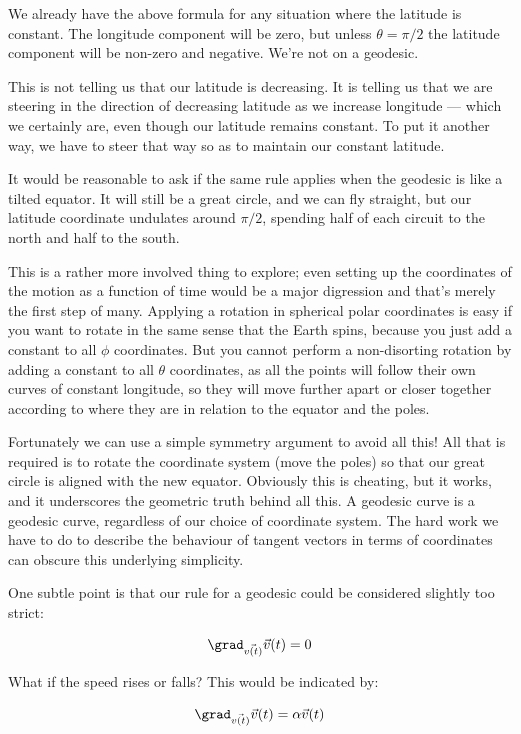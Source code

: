 We already have the above formula for any situation where the latitude is constant. The longitude component will be zero, but unless $\theta = \pi/2$ the latitude component will be non-zero and negative. We're not on a geodesic.

This is not telling us that our latitude is decreasing. It is telling us that we are steering in the direction of decreasing latitude as we increase longitude --- which we certainly are, even though our latitude remains constant. To put it another way, we have to steer that way so as to maintain our constant latitude.

It would be reasonable to ask if the same rule applies when the geodesic is like a tilted equator. It will still be a great circle, and we can fly straight, but our latitude coordinate undulates around $\pi/2$, spending half of each circuit to the north and half to the south.

This is a rather more involved thing to explore; even setting up the coordinates of the motion as a function of time would be a major digression and that's merely the first step of many. Applying a rotation in spherical polar coordinates is easy if you want to rotate in the same sense that the Earth spins, because you just add a constant to all $\phi$ coordinates. But you cannot perform a non-disorting rotation by adding a constant to all $\theta$ coordinates, as all the points will follow their own curves of constant longitude, so they will move further apart or closer together according to where they are in relation to the equator and the poles.

Fortunately we can use a simple symmetry argument to avoid all this! All that is required is to rotate the coordinate system (move the poles) so that our great circle is aligned with the new equator. Obviously this is cheating, but it works, and it underscores the geometric truth behind all this. A geodesic curve is a geodesic curve, regardless of our choice of coordinate system. The hard work we have to do to describe the behaviour of tangent vectors in terms of coordinates can obscure this underlying simplicity.

One subtle point is that our rule for a geodesic could be considered slightly too strict:

$$
\grad_{\vec{v(t)}} \vec{v}(t) = 0
$$

What if the speed rises or falls? This would be indicated by:

$$
\grad_{\vec{v(t)}} \vec{v}(t) = \alpha \vec{v}(t)
$$

